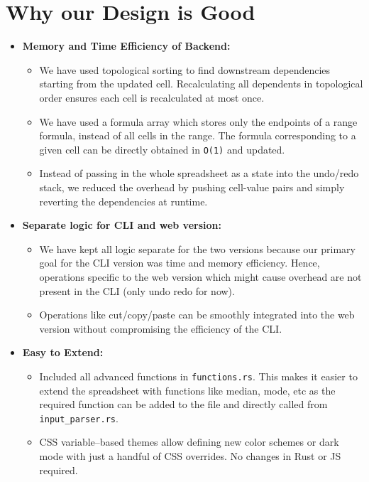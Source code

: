\documentclass[12pt]{article}
\begin{document}
    \section{Why our Design is Good}

    \begin{itemize}
        \item \textbf{Memory and Time Efficiency of Backend:}
        \begin{itemize}
            \item We have used topological sorting to find downstream dependencies starting from the updated cell. Recalculating all dependents in topological order ensures each cell is recalculated at most once.
            \item We have used a formula array which stores only the endpoints of a range formula, instead of all cells in the range. The formula corresponding to a given cell can be directly obtained in \texttt{O(1)} and updated.
            \item Instead of passing in the whole spreadsheet as a state into the undo/redo stack, we reduced the overhead by pushing cell-value pairs and simply reverting the dependencies at runtime.
        \end{itemize}
        \item \textbf{Separate logic for CLI and web version:}
        \begin{itemize}
            \item We have kept all logic separate for the two versions because our primary goal for the CLI version was time and memory efficiency. Hence, operations specific to the web version which might cause overhead are not present in the CLI (only undo redo for now).
            \item Operations like cut/copy/paste can be smoothly integrated into the web version without compromising the efficiency of the CLI.
        \end{itemize}
        \item \textbf{Easy to Extend:}
        \begin{itemize}
            \item Included all advanced functions in \texttt{functions.rs}. This makes it easier to extend the spreadsheet with functions like median, mode, etc as the required function can be added to the file and directly called from \texttt{input\_parser.rs}.
            \item CSS variable–based themes allow defining new color schemes or dark mode with just a handful of CSS overrides. No changes in Rust or JS required.

\end{itemize}
\end{itemize}
\end{document}
